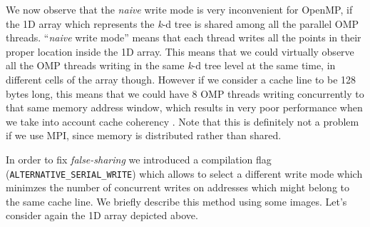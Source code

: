 \documentclass{article}
\newcommand{\kdtree}{\emph{k}-d tree}
\begin{document}
We now observe that the \emph{naive} write mode is very inconvenient for OpenMP,
if the 1D array which represents the \kdtree{} is shared among all the parallel
OMP threads. ``\emph{naive} write mode'' means that each thread writes all the
points in their proper location inside the 1D array. This means that we could
virtually observe all the OMP threads writing in the same \kdtree{} level at
the same time, in different cells of the array though. However if we consider
a cache line to be 128 bytes long, this means that we could have 8 OMP threads
writing concurrently to that same memory address window, which results in very
poor performance when we take into account cache coherency
\cite{hager2010introduction}. Note that this is definitely not a problem if we
use MPI, since memory is distributed rather than shared.

In order to fix \emph{false-sharing} we introduced a compilation flag
(\texttt{ALTERNATIVE\_SERIAL\_WRITE}) which allows to select a different write
mode which minimzes the number of concurrent writes on addresses which might
belong to the same cache line. We briefly describe this method using some
images. Let's consider again the 1D array depicted above.

\begin{figure}[H]
    \centering
\end{figure}
\end{document}
